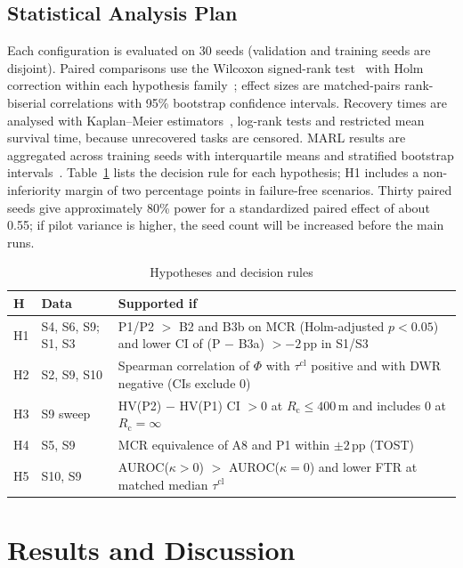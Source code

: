\documentclass[journal]{IEEEtran}
\newcommand{\Rc}{R_{\mathrm{c}}}
\begin{document}
\subsection{Statistical Analysis Plan}
Each configuration is evaluated on 30 seeds (validation and training seeds are disjoint). Paired comparisons use the Wilcoxon signed-rank test~\cite{R81_wilcoxon1945} with Holm correction within each hypothesis family~\cite{R80_holm1979}; effect sizes are matched-pairs rank-biserial correlations with 95\% bootstrap confidence intervals. Recovery times are analysed with Kaplan--Meier estimators~\cite{R79_kaplan1958}, log-rank tests and restricted mean survival time, because unrecovered tasks are censored. MARL results are aggregated across training seeds with interquartile means and stratified bootstrap intervals~\cite{R82_agarwal2021}. Table~\ref{tab:hyp} lists the decision rule for each hypothesis; H1 includes a non-inferiority margin of two percentage points in failure-free scenarios. Thirty paired seeds give approximately 80\% power for a standardized paired effect of about 0.55; if pilot variance is higher, the seed count will be increased before the main runs.

\begin{table}[!t]
\centering
\caption{Hypotheses and decision rules}
\label{tab:hyp}
\footnotesize
\begin{tabular}{@{}p{0.55cm}p{1.35cm}p{6.0cm}@{}}
\toprule
H & Data & Supported if\\
\midrule
H1 & S4, S6, S9; S1, S3 & P1/P2 $>$ B2 and B3b on MCR (Holm-adjusted $p<0.05$) and lower CI of (P $-$ B3a) $>-2$\,pp in S1/S3\\
H2 & S2, S9, S10 & Spearman correlation of $\Phi$ with $\tau^{\mathrm{cl}}$ positive and with DWR negative (CIs exclude 0)\\
H3 & S9 sweep & HV(P2) $-$ HV(P1) CI $>0$ at $\Rc\le400$\,m and includes 0 at $\Rc=\infty$\\
H4 & S5, S9 & MCR equivalence of A8 and P1 within $\pm2$\,pp (TOST)\\
H5 & S10, S9 & AUROC($\kappa>0$) $>$ AUROC($\kappa=0$) and lower FTR at matched median $\tau^{\mathrm{cl}}$\\
\bottomrule
\end{tabular}
\end{table}

\section{Results and Discussion}\label{sec:results}
\end{document}
